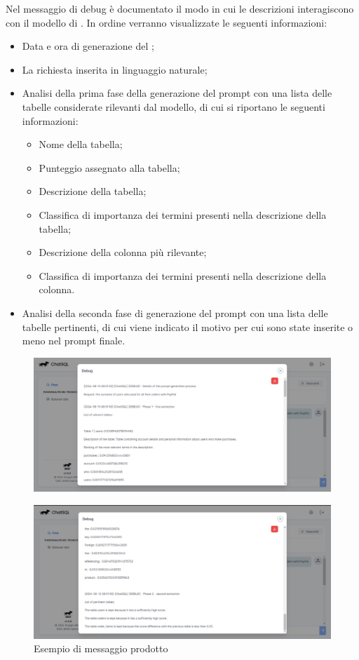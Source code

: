 \par Nel messaggio di debug è documentato il modo in cui le descrizioni interagiscono con il modello di . In ordine verranno visualizzate le seguenti informazioni: 
\begin{itemize}
  \item Data e ora di generazione del ; 
  \item La richiesta inserita in linguaggio naturale;
  \item Analisi della prima fase della generazione del prompt con una lista delle tabelle considerate rilevanti dal modello, di cui si riportano le seguenti informazioni:
  \begin{itemize}
    \item Nome della tabella;
    \item Punteggio assegnato alla tabella;
    \item Descrizione della tabella;
    \item Classifica di importanza dei termini presenti nella descrizione della tabella;
    \item Descrizione della colonna più rilevante;
    \item Classifica di importanza dei termini presenti nella descrizione della colonna.
  \end{itemize}
  \item Analisi della seconda fase di generazione del prompt con una lista delle tabelle pertinenti, di cui viene indicato il motivo per cui sono state inserite o meno nel prompt finale.
\end{itemize}
\begin{figure}[H]
  \centering
  \includegraphics[width=\textwidth]{assets/analisi_debug1.jpg}
\end{figure}

\begin{figure}[H]
  \centering
  \includegraphics[width=\textwidth]{assets/analisi_debug2.jpg}
  \caption{Esempio di messaggio prodotto}
\end{figure}

